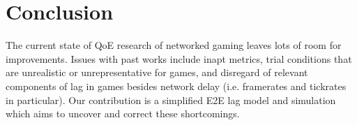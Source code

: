 \section{Conclusion}
\label{sec:conclusion}

The current state of \gls{QoE} research of networked gaming leaves lots of room for improvements. Issues with past works include inapt metrics, trial conditions that are unrealistic or unrepresentative for games, and disregard of relevant components of lag in games besides network delay (i.e. framerates and tickrates in particular). Our contribution is a simplified \gls{E2E} lag model and simulation which aims to uncover and correct these shortcomings.




